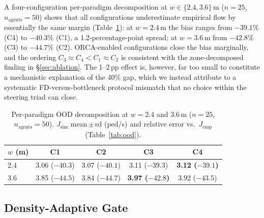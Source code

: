 \documentclass[a4paper,twoside]{article}
\begin{document}
A four-configuration per-paradigm decomposition at $w\in\{2.4,3.6\}$\,m ($n=25$, $n_{\text{agents}}=50$) shows that all configurations underestimate empirical flow by essentially the same margin (Table~\ref{tab:ood-per-paradigm}): at $w=2.4$\,m the bias ranges from $-39.1\%$ (C4) to $-40.3\%$ (C1), a 1.2-percentage-point spread; at $w=3.6$\,m from $-42.8\%$ (C3) to $-44.7\%$ (C2). ORCA-enabled configurations close the bias marginally, and the ordering $C_3{\approx}C_4\!<\!C_1{\approx}C_2$ is consistent with the zone-decomposed finding in \S\ref{sec:ablation}. The 1--2\,pp effect is, however, far too small to constitute a mechanistic explanation of the 40\% gap, which we instead attribute to a systematic FD-versus-bottleneck protocol mismatch that no choice within the steering triad can close.

\begin{table}[h]
\caption{Per-paradigm OOD decomposition at $w=2.4$ and $3.6$\,m ($n=25$, $n_{\mathrm{agents}}=50$). $J_{\mathrm{sim}}$ mean\,$\pm$\,sd (ped/s) and relative error vs.\ $J_{\mathrm{emp}}$ (Table~\ref{tab:ood}).}\label{tab:ood-per-paradigm}
\centering\scriptsize
\setlength{\tabcolsep}{3pt}
\begin{tabular}{@{}lcccc@{}}
\toprule
$w$ (m) & C1 & C2 & C3 & C4 \\
\midrule
2.4 & 3.06 ($-40.3$) & 3.07 ($-40.1$) & 3.11 ($-39.3$) & \textbf{3.12 ($-39.1$)} \\
3.6 & 3.85 ($-44.5$) & 3.84 ($-44.7$) & \textbf{3.97 ($-42.8$)} & 3.92 ($-43.5$) \\
\bottomrule
\end{tabular}
\end{table}

\subsection{Density-Adaptive Gate}
\label{sec:force-diag}
\end{document}
